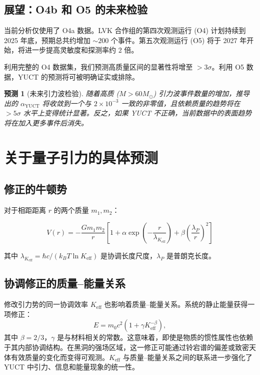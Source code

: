 \documentclass[11pt,a4paper]{article}
\newtheorem{prediction}[theorem]{预测}
\theoremstyle{remark}
\newcommand{\Keff}{K_{\mathrm{eff}}}
\begin{document}
	\subsection{展望：O4b 和 O5 的未来检验}
	
	当前分析仅使用了 O4a 数据。LVK 合作组的第四次观测运行 (O4) 计划持续到 2025 年底，预期总共约增加 $\sim 200$ 个事件。第五次观测运行 (O5) 将于 2027 年开始，将进一步提高灵敏度和探测率约 $2$ 倍。
	
	利用完整的 O4 数据集，我们预测高质量区间的显著性将增至 $> 3\sigma$。利用 O5 数据，YUCT 的预测将可被明确证实或排除。
	
	\begin{prediction}[未来引力波检验]
		随着高质 ($M > 60 M_\odot$) 引力波事件数量的增加，推导出的 $\alpha_{\text{YUCT}}$ 将收敛到一个与 $2\times 10^{-3}$ 一致的非零值，且依赖质量的趋势将在 $> 5\sigma$ 水平上变得统计显著。反之，如果 YUCT 不正确，当前数据中的表面趋势将在加入更多事件后消失。
	\end{prediction}
	
	\section{关于量子引力的具体预测}
	\label{sec:predictions}
	
	\subsection{修正的牛顿势}
	
	对于相距距离 $r$ 的两个质量 $m_1, m_2$：
	
	\begin{equation}
		V(r) = -\frac{G m_1 m_2}{r} \left[ 1 + \alpha \exp\left(-\frac{r}{\lambda_{\Keff}}\right) + \beta \left(\frac{\lambda_P}{r}\right)^2 \right]
	\end{equation}
	
	其中 $\lambda_{\Keff} = \hbar c / (k_B T \ln \Keff)$ 是协调长度尺度，$\lambda_P$ 是普朗克长度。
	
	\subsection{协调修正的质量–能量关系}
	\label{subsec:coord-emc2-G}
	
	修改引力势的同一协调效率 $\Keff$ 也影响着质量–能量关系。系统的静止能量获得一项修正：
	\[
	E = m_{0} c^{2} \left(1 + \gamma K_{\mathrm{eff}}^{-\beta}\right),
	\]
	其中 $\beta = 2/3$，$\gamma$ 是与材料相关的常数。这意味着，即使是物质的惯性属性也依赖于其内部协调结构。在黑洞的强场区域，这一修正可能通过铃宕谱的偏差或致密天体有效质量的变化而变得可观测。$\Keff$ 与质量–能量关系之间的联系进一步强化了 YUCT 中引力、信息和能量现象的统一性。
	
\end{document}
